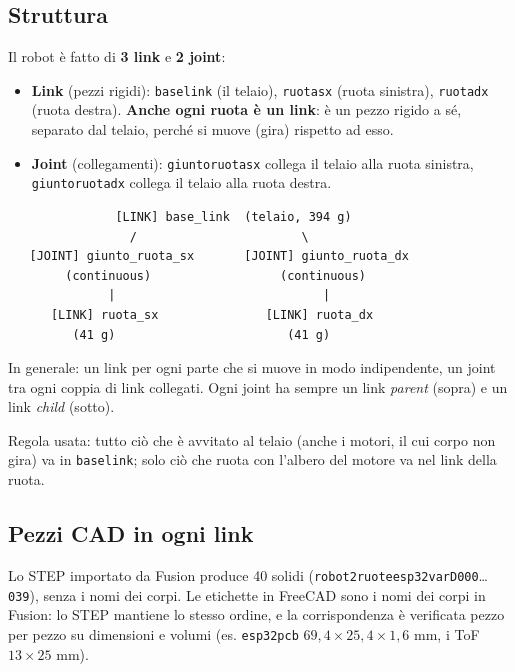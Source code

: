 \documentclass[11pt,a4paper]{article}
\renewcommand{\_}{\oldunderscore\allowbreak}
\begin{document}
\subsection{Struttura}
Il robot \`e fatto di \textbf{3 link} e \textbf{2 joint}:
\begin{itemize}[leftmargin=*]
  \item \textbf{Link} (pezzi rigidi): \texttt{base\_link} (il telaio), \texttt{ruota\_sx} (ruota
    sinistra), \texttt{ruota\_dx} (ruota destra). \textbf{Anche ogni ruota \`e un link}: \`e un pezzo
    rigido a s\'e, separato dal telaio, perch\'e si muove (gira) rispetto ad esso.
  \item \textbf{Joint} (collegamenti): \texttt{giunto\_ruota\_sx} collega il telaio alla ruota sinistra,
    \texttt{giunto\_ruota\_dx} collega il telaio alla ruota destra.
\end{itemize}

\begin{lstlisting}
               [LINK] base_link  (telaio, 394 g)
                 /                       \
   [JOINT] giunto_ruota_sx       [JOINT] giunto_ruota_dx
        (continuous)                  (continuous)
              |                             |
      [LINK] ruota_sx               [LINK] ruota_dx
         (41 g)                        (41 g)
\end{lstlisting}
In generale: un link per ogni parte che si muove in modo indipendente, un joint tra ogni coppia di link
collegati. Ogni joint ha sempre un link \emph{parent} (sopra) e un link \emph{child} (sotto).

Regola usata: tutto ci\`o che \`e avvitato al telaio (anche i motori, il cui corpo non gira) va in
\texttt{base\_link}; solo ci\`o che ruota con l'albero del motore va nel link della ruota.

\subsection{Pezzi CAD in ogni link}
Lo STEP importato da Fusion produce 40 solidi (\texttt{robot\_2ruote\_esp32\_varD000}\ldots\texttt{039}),
senza i nomi dei corpi. Le etichette in FreeCAD sono i nomi dei corpi in Fusion: lo STEP mantiene lo
stesso ordine, e la corrispondenza \`e verificata pezzo per pezzo su dimensioni e volumi (es.
\texttt{esp32\_pcb} $69{,}4\times25{,}4\times1{,}6$ mm, i ToF $13\times25$ mm).
\end{document}
